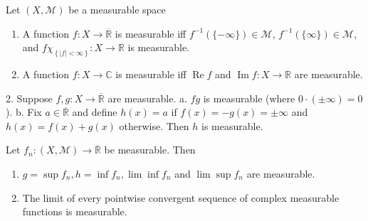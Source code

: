 \documentclass[12pt, a4paper, oneside]{book}
\begin{document}
\begin{proposition}
    Let $\left(X,\mathcal{M}\right)$ be a measurable space
    \begin{enumerate}
        \item
              A function $f: X \rightarrow \overline{\mathbb{R}}$ is measurable iff $f^{-1}(\{-\infty\}) \in \mathcal{M}$, $f^{-1}(\{\infty\}) \in \mathcal{M}$, and $f\chi_{\left\{\left|f\right|<\infty\right\}}:X\to \mathbb{R}$ is measurable.
        \item
              A function $f:X\to \mathbb{C}$ is measurable iff $\operatorname{Re} f$ and $\operatorname{Im} f: X\to \mathbb{R}$ are measurable.
    \end{enumerate}
\end{proposition}




\begin{proposition}

    2. Suppose $f, g: X \rightarrow \overline{\mathbb{R}}$ are measurable.
    a. $f g$ is measurable (where $0 \cdot( \pm \infty)=0$ ).
    b. Fix $a \in \overline{\mathbb{R}}$ and define $h(x)=a$ if $f(x)=-g(x)= \pm \infty$ and $h(x)= f(x)+g(x)$ otherwise. Then $h$ is measurable.
\end{proposition}



\begin{proposition}
    Let $f_n :\left(X,\mathcal{M}\right)\rightarrow \overline{\mathbb{R}}$ be measurable. Then
    \begin{enumerate}
        \item
              $g=\sup f_n, h=\inf f_n,\lim\inf f_n$ and $\lim\sup f_n$ are measurable.

        \item
              The limit of every pointwise convergent sequence of complex measurable functions is measurable.
    \end{enumerate}
\end{proposition}
\end{document}
